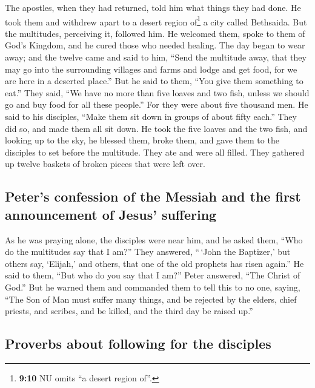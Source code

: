  The apostles, when they had returned, told him what
things they had done. He took them and withdrew apart to a desert region
of\footnote{\textbf{9:10} NU omits ``a desert region of''.} a city
called Bethsaida.  But the multitudes, perceiving it,
followed him. He welcomed them, spoke to them of God's Kingdom, and he
cured those who needed healing.  The day began to wear
away; and the twelve came and said to him, ``Send the multitude away,
that they may go into the surrounding villages and farms and lodge and
get food, for we are here in a deserted place.''  But he
said to them, ``You give them something to eat.'' They said, ``We have
no more than five loaves and two fish, unless we should go and buy food
for all these people.''  For they were about five
thousand men. He said to his disciples, ``Make them sit down in groups
of about fifty each.''  They did so, and made them all
sit down.  He took the five loaves and the two fish, and
looking up to the sky, he blessed them, broke them, and gave them to the
disciples to set before the multitude.  They ate and were
all filled. They gathered up twelve baskets of broken pieces that were
left over.

\hypertarget{peters-confession-of-the-messiah-and-the-first-announcement-of-jesus-suffering}{%
\subsection{Peter's confession of the Messiah and the first announcement
of Jesus'
suffering}\label{peters-confession-of-the-messiah-and-the-first-announcement-of-jesus-suffering}}

 As he was praying alone, the disciples were near him,
and he asked them, ``Who do the multitudes say that I am?''
 They answered, ``\,`John the Baptizer,' but others say,
`Elijah,' and others, that one of the old prophets has risen again.''
 He said to them, ``But who do you say that I am?'' Peter
answered, ``The Christ of God.''  But he warned them and
commanded them to tell this to no one,  saying, ``The Son
of Man must suffer many things, and be rejected by the elders, chief
priests, and scribes, and be killed, and the third day be raised up.''

\hypertarget{proverbs-about-following-for-the-disciples}{%
\subsection{Proverbs about following for the
disciples}\label{proverbs-about-following-for-the-disciples}}

